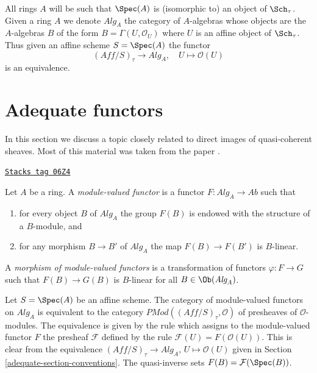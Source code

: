 \medskip\noindent
All rings $A$ will be such that $\Spec(A)$ is (isomorphic to) an
object of $\Sch_\tau$. Given a ring $A$ we denote
$\textit{Alg}_A$ the category of $A$-algebras whose objects are the
$A$-algebras $B$ of the form $B = \Gamma(U, \mathcal{O}_U)$
where $U$ is an affine object of $\Sch_\tau$. Thus given an
affine scheme $S = \Spec(A)$ the functor
$$
(\textit{Aff}/S)_\tau \longrightarrow \textit{Alg}_A,
\quad
U \longmapsto \mathcal{O}(U)
$$
is an equivalence.

\section{Adequate functors}
\label{adequate-section-quasi-coherent}
In this section we discuss a topic closely related to
direct images of quasi-coherent sheaves. Most of this material
was taken from the paper \cite{Jaffe}.

\begin{definition}
\label{adequate-definition-module-valued-functor}
\href{https://stacks.math.columbia.edu/tag/06Z4}{\texttt{Stacks tag 06Z4}}

Let $A$ be a ring. A {\it module-valued functor} is a functor
$F : \textit{Alg}_A \to \textit{Ab}$ such that
\begin{enumerate}
\item for every object $B$ of $\textit{Alg}_A$ the group
$F(B)$ is endowed with the structure of a $B$-module, and
\item for any morphism $B \to B'$ of $\textit{Alg}_A$ the map
$F(B) \to F(B')$ is $B$-linear.
\end{enumerate}
A {\it morphism of module-valued functors} is a transformation of
functors $\varphi : F \to G$ such that $F(B) \to G(B)$ is $B$-linear
for all $B \in \Ob(\textit{Alg}_A)$.
\end{definition}

Let $S = \Spec(A)$ be an affine scheme.
The category of module-valued functors on $\textit{Alg}_A$ is
equivalent to the category
$\textit{PMod}((\textit{Aff}/S)_\tau, \mathcal{O})$
of presheaves of $\mathcal{O}$-modules. The equivalence is given
by the rule which assigns to the module-valued functor $F$ the
presheaf $\mathcal{F}$ defined by the rule
$\mathcal{F}(U) = F(\mathcal{O}(U))$.
This is clear from the equivalence
$(\textit{Aff}/S)_\tau \to \textit{Alg}_A$, $U \mapsto \mathcal{O}(U)$
given in Section \ref{adequate-section-conventions}.
The quasi-inverse sets $F(B) = \mathcal{F}(\Spec(B))$.

